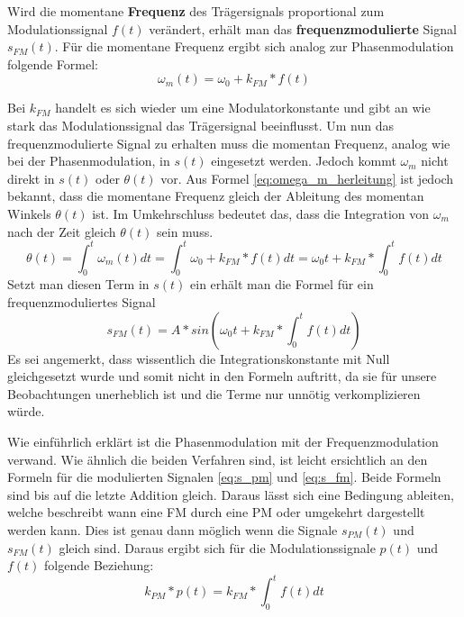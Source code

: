 Wird die momentane \textbf{Frequenz} des Trägersignals proportional zum Modulationssignal \(f(t)\) verändert, erhält man das \textbf{frequenzmodulierte} Signal \(s_{FM}(t)\). \cite[S. 210]{lathi} Für die momentane Frequenz ergibt sich analog zur Phasenmodulation folgende Formel:
\begin{equation}
\omega_m(t)=\omega_0+k_{FM}*f(t)
\label{eq:omega_m}
\end{equation}

Bei \(k_{FM}\) handelt es sich wieder um eine Modulatorkonstante und gibt an wie stark das Modulationssignal das Trägersignal beeinflusst. Um nun das frequenzmodulierte Signal zu erhalten muss die momentan Frequenz, analog wie bei der Phasenmodulation, in \(s(t)\) eingesetzt werden. Jedoch kommt \(\omega_m\) nicht direkt in \(s(t)\) oder \(\theta(t)\) vor. Aus Formel \ref{eq:omega_m_herleitung} ist jedoch bekannt, dass die momentane Frequenz gleich der  Ableitung des momentan Winkels \(\theta(t)\) ist. Im Umkehrschluss bedeutet das, dass die Integration von \(\omega_m\) nach der Zeit gleich \(\theta(t)\) sein muss.
\begin{equation*}
\theta(t)=\int_0^t{\omega_m(t)} dt = \int_0^t{\omega_0 + k_{FM}*f(t)} dt = \omega_0t + k_{FM} * \int_0^t{f(t)} dt
\end{equation*}
Setzt man diesen Term in \(s(t)\) ein erhält man die Formel für ein frequenzmoduliertes Signal
\begin{equation}
s_{FM}(t)=A*sin(\omega_0t + k_{FM} * \int_0^t{f(t)} dt)
\label{eq:s_fm}
\end{equation}
Es sei angemerkt, dass wissentlich die Integrationskonstante mit Null gleichgesetzt wurde und somit nicht in den Formeln auftritt, da sie für unsere Beobachtungen unerheblich ist und die Terme nur unnötig verkomplizieren würde.

Wie einführlich erklärt ist die Phasenmodulation mit der Frequenzmodulation verwand. Wie ähnlich die beiden Verfahren sind, ist leicht ersichtlich an den Formeln für die modulierten Signalen \ref{eq:s_pm} und \ref{eq:s_fm}. Beide Formeln sind bis auf die letzte Addition gleich. Daraus lässt sich eine Bedingung ableiten, welche beschreibt wann eine FM durch eine PM oder umgekehrt dargestellt werden kann. Dies ist genau dann möglich wenn die Signale \(s_{PM}(t)\) und \(s_{FM}(t)\) gleich sind. Daraus ergibt sich für die Modulationssignale \(p(t)\) und \(f(t)\) folgende Beziehung:
\begin{equation}
k_{PM}*p(t)=k_{FM} * \int_0^t{f(t)} dt
\end{equation}

